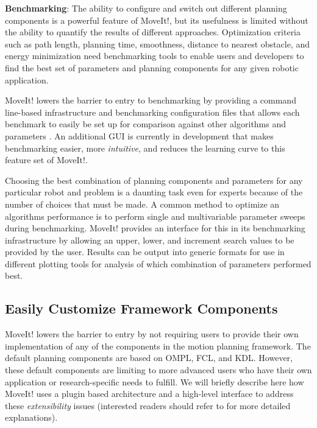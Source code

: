 \documentclass[10pt,journal,compsoc]{joser1}
\begin{document}
{{\bf Benchmarking}: The ability to configure and switch out different planning components is a powerful feature of MoveIt!, but its usefulness is limited without the ability to quantify the results of different approaches. Optimization criteria such as path length, planning time, smoothness, distance to nearest obstacle, and energy minimization need benchmarking tools to enable users and developers to find the best set of parameters and planning components for any given robotic application.

MoveIt! lowers the barrier to entry to benchmarking by providing a command line-based infrastructure and benchmarking configuration files that allows each benchmark to easily be set up for comparison against other algorithms and parameters \cite{cohen2012generic}. An additional GUI is currently in development that makes benchmarking easier, more \textit{intuitive}, and reduces the learning curve to this feature set of MoveIt!.

Choosing the best combination of planning components and parameters for any particular robot and problem is a daunting task even for experts because of the number of choices that must be made\cite{cohen2012generic}. A common method to optimize an algorithms performance is to perform single and multivariable parameter sweeps during benchmarking. MoveIt! provides an interface for this in its benchmarking infrastructure by allowing an upper, lower, and increment search values to be provided by the user. Results can be output into generic formats for use in different plotting tools for analysis of which combination of parameters performed best.

\subsection{Easily Customize Framework Components}
\label{subsec:extensiblity}

MoveIt! lowers the barrier to entry by not requiring users to provide their own implementation of any of the components in the motion planning framework. The default planning components are based on OMPL, FCL, and KDL. However, these default components are limiting to more advanced users who have their own application or research-specific needs to fulfill. We will briefly describe here how MoveIt! uses a plugin based architecture and a high-level interface to address these \textit{extensibility} issues (interested readers should refer to \cite{moveit} for more detailed explanations). 

}
\end{document}
